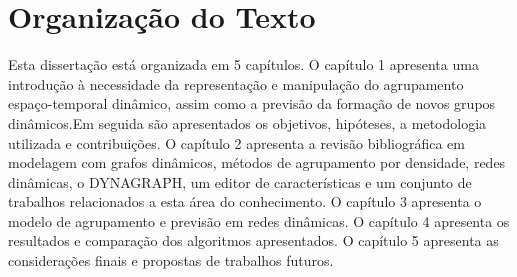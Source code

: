 \section{Organização do Texto}
Esta dissertação está organizada em 5 capítulos. O capítulo 1 apresenta uma
introdução à necessidade da representação e manipulação do agrupamento espaço-temporal
dinâmico, assim como a previsão da formação de novos grupos dinâmicos.Em seguida são apresentados os objetivos,
hipóteses, a metodologia utilizada e contribuições. O capítulo 2 apresenta a revisão
bibliográfica em modelagem com grafos dinâmicos, métodos de agrupamento por densidade, redes dinâmicas,
o DYNAGRAPH, um editor de características e um conjunto de trabalhos relacionados a esta área do conhecimento.
O capítulo 3 apresenta o modelo de agrupamento e previsão em redes dinâmicas. O capítulo 4 apresenta
os resultados e comparação dos algoritmos apresentados. O capítulo 5 apresenta as considerações finais
e propostas de trabalhos futuros.








